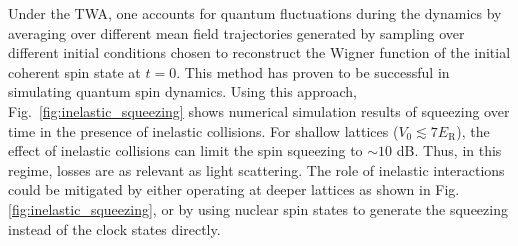 \documentclass[aps,prx,superscriptaddress,notitlepage,twocolumn,longbibliography]{revtex4-2}
\renewcommand{\t}{\text} %
\begin{document}
Under the TWA, one accounts for quantum fluctuations during the dynamics by  averaging over different mean field trajectories generated by sampling over different initial conditions chosen to reconstruct the Wigner function of the initial coherent spin state at $t=0$\cite{rey2014probing}.
This method has proven to be successful in simulating quantum spin dynamics.
Using this approach, Fig.~\ref{fig:inelastic_squeezing} shows numerical simulation results of squeezing over time in the presence of inelastic collisions.
For shallow lattices ($V_0\lesssim7E_{\t{R}}$), the effect of inelastic collisions can limit the spin squeezing to $\sim10$ dB.
Thus, in this regime, losses are as relevant as light scattering.
The role of inelastic interactions could be mitigated by either operating at deeper lattices as shown in Fig. \ref{fig:inelastic_squeezing}, or by using nuclear spin states to generate the squeezing instead of the clock states directly.



\end{document}
